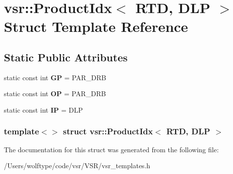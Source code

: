 \hypertarget{structvsr_1_1_product_idx_3_01_r_t_d_00_01_d_l_p_01_4}{\section{vsr\-:\-:Product\-Idx$<$ R\-T\-D, D\-L\-P $>$ Struct Template Reference}
\label{structvsr_1_1_product_idx_3_01_r_t_d_00_01_d_l_p_01_4}
}
\subsection*{Static Public Attributes}
\begin{DoxyCompactItemize}
\item 
\hypertarget{structvsr_1_1_product_idx_3_01_r_t_d_00_01_d_l_p_01_4_abaf1839c23adb146f34180a01653d0a8}{static const int {\bfseries G\-P} = P\-A\-R\-\_\-\-D\-R\-B}\label{structvsr_1_1_product_idx_3_01_r_t_d_00_01_d_l_p_01_4_abaf1839c23adb146f34180a01653d0a8}

\item 
\hypertarget{structvsr_1_1_product_idx_3_01_r_t_d_00_01_d_l_p_01_4_a0f7c28cedd76c0e772ba1a6ab527c23f}{static const int {\bfseries O\-P} = P\-A\-R\-\_\-\-D\-R\-B}\label{structvsr_1_1_product_idx_3_01_r_t_d_00_01_d_l_p_01_4_a0f7c28cedd76c0e772ba1a6ab527c23f}

\item 
\hypertarget{structvsr_1_1_product_idx_3_01_r_t_d_00_01_d_l_p_01_4_ad74a341f861ac2e9562b82be490b5058}{static const int {\bfseries I\-P} = D\-L\-P}\label{structvsr_1_1_product_idx_3_01_r_t_d_00_01_d_l_p_01_4_ad74a341f861ac2e9562b82be490b5058}

\end{DoxyCompactItemize}
\subsubsection*{template$<$$>$ struct vsr\-::\-Product\-Idx$<$ R\-T\-D, D\-L\-P $>$}



The documentation for this struct was generated from the following file\-:\begin{DoxyCompactItemize}
\item 
/\-Users/wolftype/code/vsr/\-V\-S\-R/vsr\-\_\-templates.\-h\end{DoxyCompactItemize}
